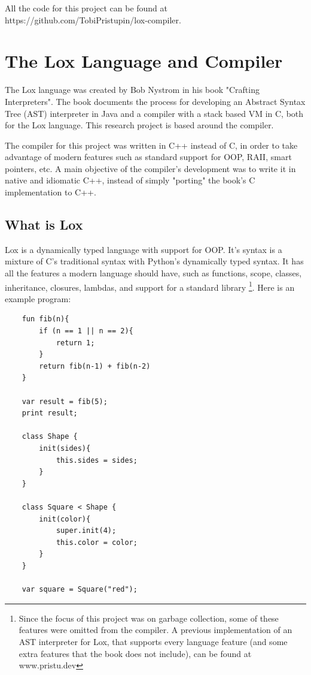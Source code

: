 \documentclass[10pt]{extarticle}
\begin{document}
\medskip
All the code for this project can be found at https://github.com/TobiPristupin/lox-compiler.

\section{The Lox Language and Compiler}
The Lox language was created by Bob Nystrom in his book "Crafting Interpreters". The book documents the process for developing an Abstract Syntax Tree (AST) interpreter in Java and a compiler with a stack based VM in C, both for the Lox language. This research project is based around the compiler. 

The compiler for this project was written in C++ instead of C, in order to take advantage of modern features such as standard support for OOP, RAII, smart pointers, etc. A main objective of the compiler's development was to write it in native and idiomatic C++, instead of simply "porting" the book's C implementation to C++.

\subsection{What is Lox}

Lox is a dynamically typed language with support for OOP. It's syntax is a mixture of C's traditional syntax with Python's dynamically typed syntax. It has all the features a modern language should have, such as functions, scope, classes, inheritance, closures, lambdas, and support for a standard library \footnote{Since the focus of this project was on garbage collection, some of these features were omitted from the compiler. A previous implementation of an AST interpreter for Lox, that supports every language feature  (and some extra features that the book does not include), can be found at www.pristu.dev}. Here is an example program:

\begin{lstlisting}
    fun fib(n){
        if (n == 1 || n == 2){
            return 1;
        }
        return fib(n-1) + fib(n-2)
    }

    var result = fib(5);
    print result;

    class Shape {
        init(sides){
            this.sides = sides;
        }
    }

    class Square < Shape {
        init(color){
            super.init(4);
            this.color = color;
        }
    }

    var square = Square("red");
\end{lstlisting}
\end{document}
